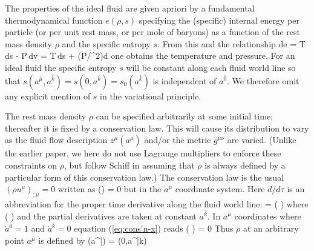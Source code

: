 The properties of the ideal fluid are given apriori by a
fundamental thermodynamical function $e(\rho,s)$ specifying the
(specific) internal energy per particle (or per unit rest mass,
or per mole of baryons) as a function of the rest mass density
$\rho$ and the specific entropy $s$.
From this and the relationship
\be\label{eq:first_law}
     de = T\,ds - P\,dv = T\,ds + (P/\rho^2)d\rho
\ee
one obtains the temperature and pressure.
For an ideal fluid the specific entropy $s$ will be constant
along each fluid world line so that $s(a^{\bar{\mu}},a^{\bar{k}})
= s(0,a^{\bar{k}}) = s_0(a^{\bar{k}})$ is independent of
$a^{\bar{0}}$.
We therefore omit any explicit mention of $s$ in the variational
principle.

The rest mass density $\rho$ can be specified arbitrarily at some
initial time; thereafter it is fixed by a conservation law.
This will cause its distribution to vary as the fluid flow
description $z^\mu(a^{\bar{\mu}})$ and/or the metric $g^{\mu\nu}$
are varied.
(Unlike the earlier paper\cite{A:CWM96}, we here do not use
Lagrange multipliers to enforce these constraints on $\rho$, but
follow Schiff \cite{A:CS97} in assuming that $\rho$ is always
defined by a particular form of this conservation law.)
The conservation law is the usual $(\rho u^\mu)_{;\mu} = 0$
written as
\be\label{eq:cons'n-x}
\left(\rho {}\right) = 0
\ee
but in the $a^{\bar{\mu}}$ coordinate system.
Here $d/d\tau$ is an abbreviation for the proper time
derivative along the fluid world line:
\be
  = 
      \left(   \right)
\ee
where
\be
     \equiv {} \equiv
   \left(   \right)
\ee
and the partial derivatives are taken at constant $a^{\bar{k}}$.
In $a^{\bar{\mu}}$ coordinates where $\dot{a}^{\bar{0}} = 1$ and
$\dot{a}^{\bar{k}} = 0$
equation (\ref{eq:cons'n-x}) reads
\be
\left(\rho
\right) = 0
\ee
Thus $\rho$ at an arbitrary point $a^{\bar{\mu}}$ is defined by
\be\label{eq:cons'n-def}
\rho(a^{\bar{\mu}})
 =
\rho(0,a^{\bar{k}})
\ee







